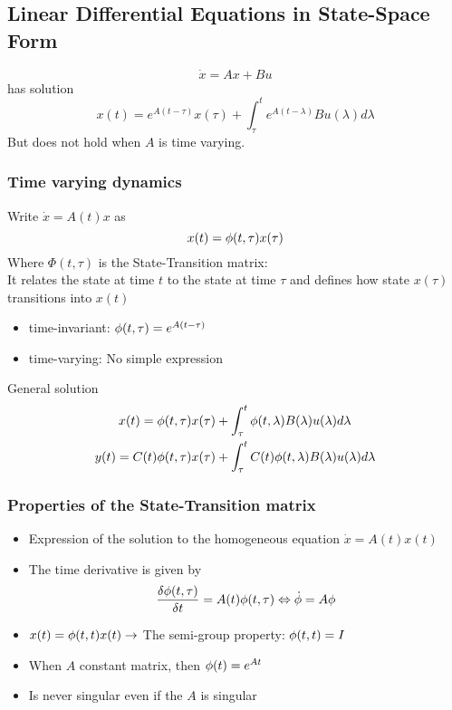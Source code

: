 \subsection{Linear Differential Equations in State-Space Form}%
\label{dls:sub:linear_differential_equations_in_state_space_form}
\[\dot{x} = Ax + Bu\]
has solution 
\[x(t) = e^{A(t - \tau)} x(\tau) + \int_\tau^t e^{A(t - \lambda)} B u(\lambda) d\lambda\]
But does not hold when \(A\) is time varying.

\subsubsection{Time varying dynamics}%
\label{dls:ssub:time_varying_dynamics}
Write \(\dot{x} = A(t)x\) as
\[x(t) = \phi(t,\tau)x(\tau)\]
Where \(\Phi(t,\tau)\) is the State-Transition matrix:\\
It relates the state at time \(t\) to the state at time \(\tau\) and defines how state \(x(\tau)\) transitions
into \(x(t)\)
\begin{itemize}
\item time-invariant: \(\phi(t,\tau) = e^{A(t-\tau)}\)
\item time-varying: No simple expression
\end{itemize}
General solution
\begin{align*}
  x(t) = \phi(t, \tau)x(\tau) &+ \int_\tau^t \phi(t,\lambda)B(\lambda)u(\lambda)d\lambda\\
  y(t) = C(t)\phi(t, \tau)x(\tau) &+ \int_\tau^t C(t) \phi(t,\lambda)B(\lambda)u(\lambda)d\lambda
\end{align*}

\subsubsection{Properties of the State-Transition matrix}%
\label{dls:ssub:properties_of_the_state_transition_matrix}
\begin{itemize}
\item Expression of the solution to the homogeneous equation \(\dot{x} = A(t)x(t)\)
\item The time derivative is given by \[\frac{\delta\phi(t,\tau)}{\delta t} = A(t)\phi(t,\tau)
    \Leftrightarrow \dot{\phi} = A \phi\]
\item \(x(t) = \phi(t,t) x(t) \rightarrow \) The semi-group property: \(\phi(t,t) = I\)
\item When \(A\) constant matrix, then \(\phi(t) = e^{At}\)
\item Is never singular even if the \(A\) is singular
\end{itemize}

